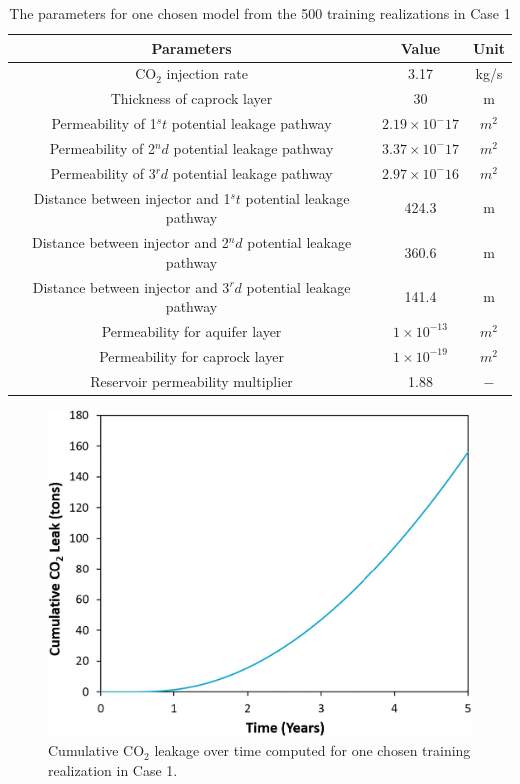 \documentclass[10pt, twoside]{article}
\begin{document}
\begin{table}
\caption{The parameters for one chosen model from the 500 training realizations in Case 1}
\label{tbl:2}
\begin{center}
\begin{tabular}{ |c|c|c| } \hline
\textbf{Parameters} & \textbf{Value} & \textbf{Unit} \\\hline \hline
CO$_2$ injection rate & 3.17 & kg/s \\ \hline
Thickness of caprock layer & 30 & m \\ \hline
Permeability of 1$^st$ potential leakage pathway & $2.19\times 10^-{17}$ & $m^2$ \\ \hline
Permeability of 2$^nd$ potential leakage pathway & $3.37\times 10^-{17}$ & $m^2$ \\ \hline
Permeability of 3$^rd$ potential leakage pathway & $2.97\times 10^-{16}$ & $m^2$ \\ \hline
Distance between injector and 1$^st$ potential leakage pathway & 424.3 & m \\ \hline
Distance between injector and 2$^nd$ potential leakage pathway & 360.6 & m \\ \hline
Distance between injector and 3$^rd$ potential leakage pathway & 141.4 & m \\ \hline
Permeability for aquifer layer & $1\times 10^{-13}$ & $m^2$ \\ \hline
Permeability for caprock layer & $1\times 10^{-19}$ & $m^2$  \\ \hline
Reservoir permeability multiplier & 1.88 & $-$ \\ \hline
\end{tabular}
\end{center}
\end{table}

\begin{figure} [H]
\centering
\includegraphics[width=8 cm]{Figure 8.jpg}
\caption{Cumulative CO$_2$ leakage over time computed for one chosen training realization in Case 1.}
\label{cum_leak_line}
\end{figure}
\end{document}
